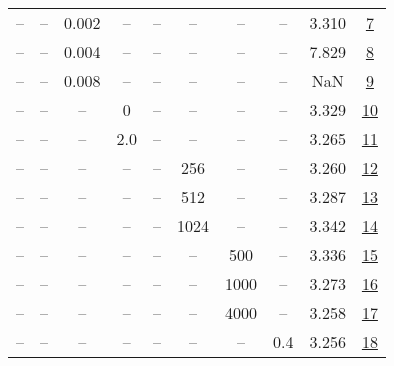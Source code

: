 \begin{table}[H]
\begin{tabular}{cccccccccc}
-- & -- & 0.002 & -- & -- & -- & -- & -- & 3.310 & \href{https://wandb.ai/stanford-mercury/optimizer-scaling/runs/sweep-130m-21B-lionj40577alr0.002-wd0.7-minlr0-warmup2000-b10.9--92e8ac}{7} \\
-- & -- & 0.004 & -- & -- & -- & -- & -- & 7.829 & \href{https://wandb.ai/stanford-mercury/optimizer-scaling/runs/sweep-130m-21B-lionj145f08lr0.004-wd0.7-minlr0-warmup2000-b10.9--a84f14}{8} \\
-- & -- & 0.008 & -- & -- & -- & -- & -- & NaN & \href{https://wandb.ai/stanford-mercury/optimizer-scaling/runs/sweep-130m-21B-lionjdc0918lr0.008-wd0.7-minlr0-warmup2000-b10.9--498ad5}{9} \\
-- & -- & -- & 0 & -- & -- & -- & -- & 3.329 & \href{https://wandb.ai/stanford-mercury/optimizer-scaling/runs/sweep-130m-21B-lionj1f7163lr0.001-wd0.7-minlr0-warmup2000-b10.9--4e41c6}{10} \\
-- & -- & -- & 2.0 & -- & -- & -- & -- & 3.265 & \href{https://wandb.ai/stanford-mercury/optimizer-scaling/runs/sweep-130m-21B-lionj8b32balr0.001-wd0.7-minlr0-warmup2000-b10.9--5de8d3}{11} \\
-- & -- & -- & -- & -- & 256 & -- & -- & 3.260 & \href{https://wandb.ai/stanford-mercury/optimizer-scaling/runs/sweep-130m-21B-lionj489f64lr0.001-wd0.7-minlr0-warmup2000-b10.9--135ae5}{12} \\
-- & -- & -- & -- & -- & 512 & -- & -- & 3.287 & \href{https://wandb.ai/stanford-mercury/optimizer-scaling/runs/sweep-130m-21B-lionj5d07e9lr0.001-wd0.7-minlr0-warmup2000-b10.9--fe860f}{13} \\
-- & -- & -- & -- & -- & 1024 & -- & -- & 3.342 & \href{https://wandb.ai/stanford-mercury/optimizer-scaling/runs/sweep-130m-21B-lionjeeafa4lr0.001-wd0.7-minlr0-warmup2000-b10.9--e5c831}{14} \\
-- & -- & -- & -- & -- & -- & 500 & -- & 3.336 & \href{https://wandb.ai/stanford-mercury/optimizer-scaling/runs/sweep-130m-21B-lionj284472lr0.001-wd0.7-minlr0-warmup500-b10.9-b-97c2b1}{15} \\
-- & -- & -- & -- & -- & -- & 1000 & -- & 3.273 & \href{https://wandb.ai/stanford-mercury/optimizer-scaling/runs/sweep-130m-21B-lionj5d664dlr0.001-wd0.7-minlr0-warmup1000-b10.9--56ad2e}{16} \\
-- & -- & -- & -- & -- & -- & 4000 & -- & 3.258 & \href{https://wandb.ai/stanford-mercury/optimizer-scaling/runs/sweep-130m-21B-liona604911lr0.001-wd0.7-minlr0-warmup4000-b10.9--bba102}{17} \\
-- & -- & -- & -- & -- & -- & -- & 0.4 & 3.256 & \href{https://wandb.ai/stanford-mercury/optimizer-scaling/runs/sweep-130m-21B-lionj24656blr0.001-wd0.4-minlr0-warmup2000-b10.9--226fed}{18} \\

\end{tabular}
\end{table}
